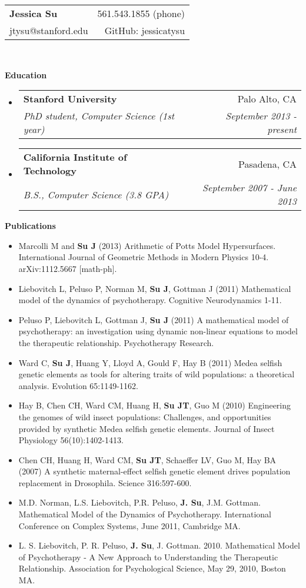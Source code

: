 \documentclass[letterpaper,11pt]{article}
\makeatletter
\newcommand{\resheading}[1]{{\large \colorbox{mygrey}{\begin{minipage}{\textwidth}{\textbf{#1 \vphantom{p\^{E}}}}\end{minipage}}}}
\newcommand{\ressubheading}[4]{
\begin{tabular*}{7.0in}{l@{\extracolsep{\fill}}r}
		\textbf{#1} & #2 \\
		\textit{#3} & \textit{#4} \\
\end{tabular*}\vspace{-6pt}}
\makeatother
\begin{document}
\begin{tabular*}{7.5in}{l@{\extracolsep{\fill}}r}
\textbf{\large Jessica Su}  & 561.543.1855 (phone)\\
jtysu@stanford.edu & GitHub: jessicatysu \\
\end{tabular*}
\\

\vspace{0.1in}

\resheading{Education}
\begin{itemize}
\item
	\ressubheading{Stanford University}{Palo Alto, CA}{PhD student, Computer Science (1st year)}{September 2013 - present}
\item
	\ressubheading{California Institute of Technology}{Pasadena, CA}{B.S., Computer Science (3.8 GPA)}{September 2007 - June 2013}

\end{itemize}

\resheading{Publications}
\begin{itemize}
	\item Marcolli M and \textbf{Su J} (2013) Arithmetic of Potts Model Hypersurfaces.  International Journal of Geometric Methods in Modern Physics 10-4.  arXiv:1112.5667 [math-ph].
	\item Liebovitch L, Peluso P, Norman M, \textbf{Su J}, Gottman J (2011) Mathematical model of the dynamics of psychotherapy.  Cognitive Neurodynamics 1-11.
	\item Peluso P, Liebovitch L, Gottman J, \textbf{Su J} (2011) A mathematical model of psychotherapy: an investigation using dynamic non-linear equations to model the therapeutic relationship.  Psychotherapy Research.
	\item Ward C, \textbf{Su J}, Huang Y, Lloyd A, Gould F, Hay B (2011) Medea selfish genetic elements as tools for altering traits of wild populations: a theoretical analysis.  Evolution 65:1149-1162.
	\item Hay B, Chen CH, Ward CM, Huang H, \textbf{Su JT}, Guo M (2010) Engineering the genomes of wild insect populations: Challenges, and opportunities provided by synthetic Medea selfish genetic elements.  Journal of Insect Physiology 56(10):1402-1413.
	\item Chen CH, Huang H, Ward CM, \textbf{Su JT}, Schaeffer LV, Guo M, Hay BA (2007) A synthetic maternal-effect selfish genetic element drives population replacement in Drosophila. Science 316:597-600.
	\item M.D. Norman, L.S. Liebovitch, P.R. Peluso, \textbf{J. Su}, J.M. Gottman.  Mathematical Model of the Dynamics of Psychotherapy.  International Conference on Complex Systems, June 2011, Cambridge MA.
	\item L. S. Liebovitch, P. R. Peluso, \textbf{J. Su}, J. Gottman. 2010. Mathematical Model of Psychotherapy - A New Approach to Understanding the Therapeutic Relationship. Association for Psychological Science, May 29, 2010, Boston MA.
\end{itemize}
\end{document}
